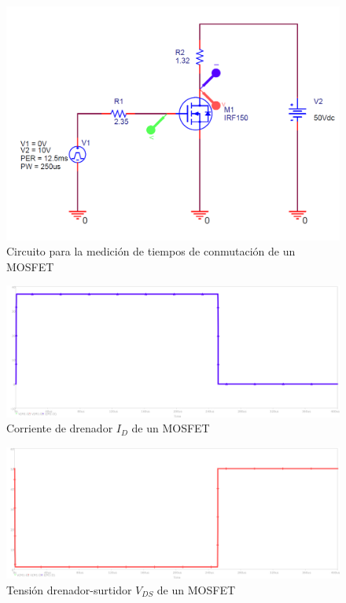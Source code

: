 \documentclass[conference]{IEEEtran}
\begin{document}
\begin{figure}[H]
	\centering
	\includegraphics[width=\columnwidth]{imagenes/circuit_mosfet}
	\caption{Circuito para la medición de tiempos de conmutación de un MOSFET}
	\label{fig:circuit_mosfet}
\end{figure}

\begin{figure}[H]
	\centering
	\includegraphics[width=\columnwidth]{imagenes/id_mosfet}
	\caption{Corriente de drenador $I_D$ de un MOSFET}
	\label{fig:ic_mosfet}
\end{figure}

\begin{figure}[H]
	\centering
	\includegraphics[width=\columnwidth]{imagenes/vds_mosfet}
	\caption{Tensión drenador-surtidor $V_{DS}$ de un MOSFET}
	\label{fig:vds_mosfet}
\end{figure}
\end{document}
